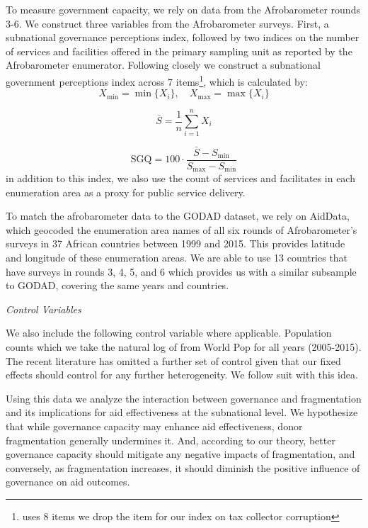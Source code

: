 \documentclass[11pt]{article}
\begin{document}
To measure government capacity, we rely on data from the Afrobarometer rounds 3-6.  We construct three variables from the Afrobarometer surveys. First, a subnational governance perceptions index, followed by  two indices on the number of services and facilities offered in the primary sampling unit as reported by the Afrobarometer enumerator. Following closely \citep{iddawela_quality_2021} we construct a subnational government perceptions index across 7 items\footnote{\citep{iddawela_quality_2021} uses 8 items we drop the item for our index on tax collector corruption}, which is calculated by:
        \[
        X_{\min} = \min\{X_i\}, \quad X_{\max} = \max\{X_i\}
        \]
        
        \[
        \bar{S} = \frac{1}{n} \sum_{i=1}^{n} X_i
        \]
        
        \[
        \text{SGQ} = 100 \cdot \frac{\bar{S} - S_{\min}}{S_{\max} - S_{\min}}
        \]
        in addition to this index, we also use the count of services and facilitates in each enumeration area as a proxy for public service delivery.

To match the afrobarometer data to the GODAD dataset, we rely on AidData, which geocoded the enumeration area names of all six rounds of Afrobarometer’s surveys in 37 African countries between 1999 and 2015. This provides latitude and longitude of these enumeration areas. We are able to use 13 countries that have surveys in rounds 3, 4, 5, and 6 which provides us with a similar subsample to GODAD, covering the same years and countries.\par 
 \vspace{1cm}
\textit{Control Variables}\par
 \vspace{.5cm}

We also include the following control variable where applicable. Population counts which we take the natural log of from World Pop for all years (2005-2015). The recent literature has omitted a further set of control given that our fixed effects should control for any further heterogeneity.  We follow suit with this idea. 

Using this data we analyze the interaction between governance and fragmentation and its implications for aid effectiveness at the subnational level. We hypothesize that while governance capacity may enhance aid effectiveness, donor fragmentation generally undermines it. And, according to our theory, better governance capacity should mitigate any negative impacts of fragmentation, and conversely, as fragmentation increases, it should diminish the positive influence of governance on aid outcomes. 
\end{document}
